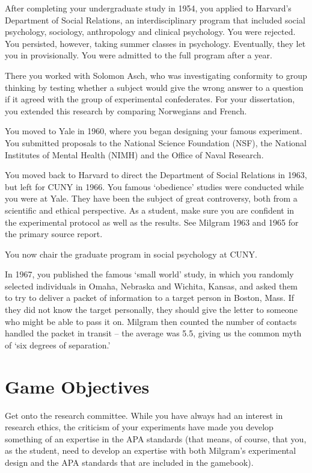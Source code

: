 After completing your undergraduate study in 1954, you applied to Harvard's Department of Social Relations, an interdisciplinary program that included social psychology, sociology, anthropology and clinical psychology. You were rejected. You persisted, however, taking summer classes in psychology. Eventually, they let you in provisionally. You were admitted to the full program after a year.

There you worked with Solomon Asch, who was investigating conformity to group thinking by testing whether a subject would give the wrong answer to a question if it agreed with the group of experimental confederates. For your dissertation, you extended this research by comparing Norwegians and French.

You moved to Yale in 1960, where you began designing your famous experiment. You submitted proposals to the National Science Foundation (NSF), the National Institutes of Mental Health (NIMH) and the Office of Naval Research.

You moved back to Harvard to direct the Department of Social Relations in 1963, but left for CUNY in 1966. You famous `obedience' studies were conducted while you were at Yale. They have been the subject of great controversy, both from a scientific and ethical perspective. As a student, make sure you are confident in the experimental protocol as well as the results. See Milgram 1963 and 1965 for the primary source report.

You now chair the graduate program in social psychology at CUNY.

In 1967, you published the famous `small world' study, in which you randomly selected individuals in Omaha, Nebraska and Wichita, Kansas, and asked them to try to deliver a packet of information to a target person in Boston, Mass. If they did not know the target personally, they should give the letter to someone who might be able to pass it on. Milgram then counted the number of contacts handled the packet in transit – the average was 5.5, giving us the common myth of `six degrees of separation.' 

\section{Game Objectives}
\label{gameobjectives}

Get onto the research committee. While you have always had an interest in research ethics, the criticism of your experiments have made you develop something of an expertise in the APA standards (that means, of course, that you, as the student, need to develop an expertise with both Milgram's experimental design and the APA standards that are included in the gamebook).

